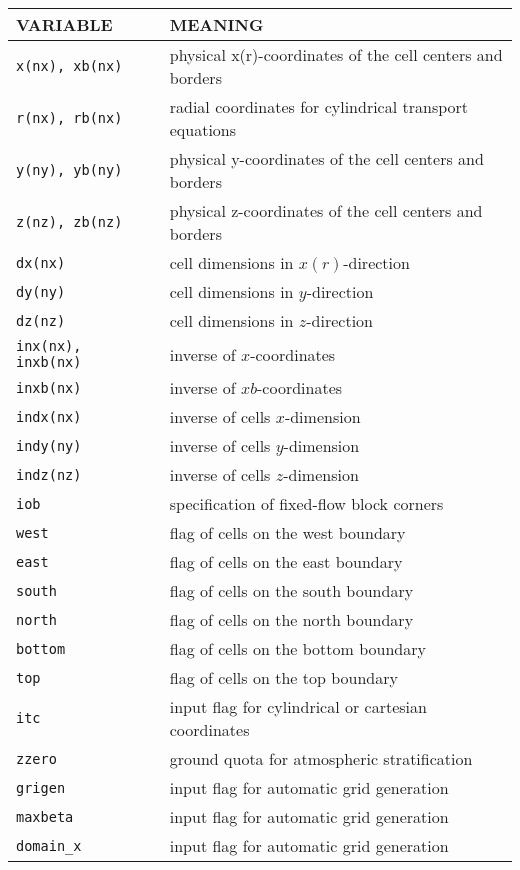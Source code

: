 \begin{tabular}{|p{6cm}|p{6cm}|}\hline
VARIABLE & MEANING\\\hline
\tt x(nx), xb(nx) & physical x(r)-coordinates of the cell centers and borders \\ \hline
\tt r(nx), rb(nx) & radial coordinates for cylindrical transport equations \\ \hline
\tt y(ny), yb(ny) & physical y-coordinates of the cell centers and borders \\ \hline
\tt z(nz), zb(nz) & physical z-coordinates of the cell centers and borders \\ \hline
\tt dx(nx) & cell dimensions in $x(r)$-direction\\ \hline
\tt dy(ny) & cell dimensions in $y$-direction\\ \hline
\tt dz(nz) & cell dimensions in $z$-direction\\ \hline
\tt inx(nx), inxb(nx) & inverse of $x$-coordinates \\ \hline
\tt inxb(nx) & inverse of $xb$-coordinates \\ \hline
\tt indx(nx) & inverse of cells $x$-dimension\\ \hline
\tt indy(ny) & inverse of cells $y$-dimension\\ \hline
\tt indz(nz) & inverse of cells $z$-dimension\\ \hline
\tt iob       & specification of fixed-flow block corners\\ \hline
\tt west      & flag of cells on the west boundary\\ \hline
\tt east      & flag of cells on the east boundary\\ \hline
\tt south     & flag of cells on the south boundary\\ \hline
\tt north     & flag of cells on the north boundary\\ \hline
\tt bottom    & flag of cells on the bottom boundary\\ \hline
\tt top       & flag of cells on the top boundary\\ \hline
\tt itc       & input flag for cylindrical or cartesian coordinates\\ \hline
\tt zzero     & ground quota for atmospheric stratification \\ \hline
\tt grigen    & input flag for automatic grid generation\\ \hline
\tt maxbeta    & input flag for automatic grid generation\\ \hline
\tt domain\_x    & input flag for automatic grid generation\\ \hline

\end{tabular}
